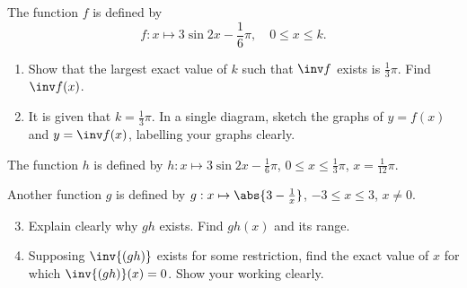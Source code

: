 \begin{problem}
    The function $f$ is defined by \[f : x \mapsto 3\sin{2x - \frac16 \pi}, \quad 0 \leq x \leq k.\]
    \begin{enumerate}
        \item Show that the largest exact value of $k$ such that $\inv f$ exists is $\frac13 \pi$. Find $\inv f(x)$.
        \item It is given that $k = \frac13 \pi$. In a single diagram, sketch the graphs of $y = f(x)$ and $y = \inv f(x)$, labelling your graphs clearly.
    \end{enumerate}

    The function $h$ is defined by $h : x \mapsto 3\sin{2x - \frac16 \pi}$, $0 \leq x \leq \frac13 \pi$, $x = \frac1{12} \pi$.

    Another function $g$ is defined by $g : x \mapsto \abs{3 - \frac1{x}}$, $-3 \leq x \leq 3$, $x \neq 0$.

    \begin{enumerate}
        \setcounter{enumi}{2}
        \item Explain clearly why $gh$ exists. Find $gh(x)$ and its range.
        \item Supposing $\inv{(gh)}$ exists for some restriction, find the exact value of $x$ for which $\inv{(gh)} (x) = 0$. Show your working clearly.
    \end{enumerate}
\end{problem}
